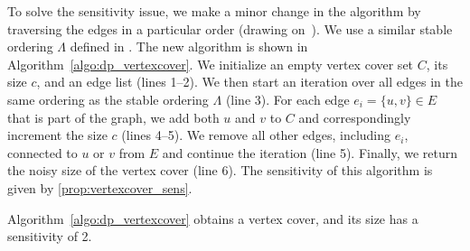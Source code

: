 To solve the sensitivity issue, we make a minor change in the algorithm by traversing the edges in a particular order (drawing on~\cite{day2016publishing}). We use a similar stable ordering $\Lambda$ defined in . The new algorithm is shown in Algorithm~\ref{algo:dp_vertexcover}. We initialize an empty vertex cover set $C$, its size $c$, and an edge list (lines 1--2). We then start an iteration over all edges in the same ordering as the stable ordering $\Lambda$ (line 3). For each edge $e_i = \{u,v\} \in E$ that is part of the graph, we add both $u$ and $v$ to $C$ and correspondingly increment the size $c$ (lines 4--5). We remove all other edges, including $e_i$, connected to $u$ or $v$ from $E$ and continue the iteration (line 5). Finally, we return the noisy size of the vertex cover (line 6). The sensitivity of this algorithm is given by \cref{prop:vertexcover_sens}. 




\begin{proposition}\label{prop:vertexcover_sens}
Algorithm~\ref{algo:dp_vertexcover} obtains a vertex cover, and its size has a sensitivity of 2.
\end{proposition}



